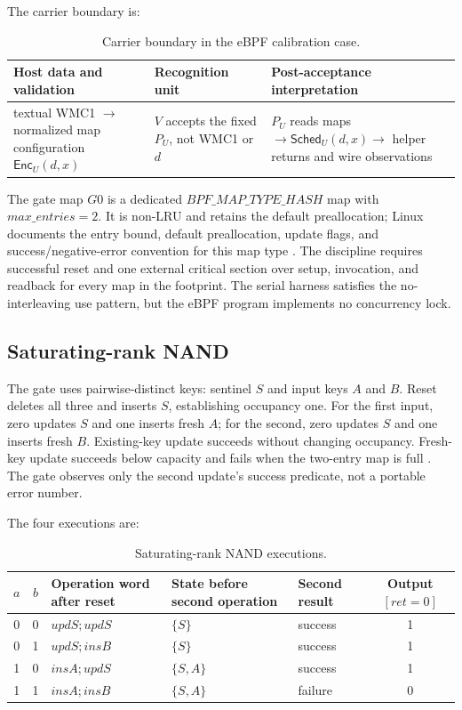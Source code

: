 \documentclass[conference]{IEEEtran}
\begin{document}
The carrier boundary is:

\begin{table}[t]
\caption{Carrier boundary in the eBPF calibration case.}
\label{tab:carrier-boundary}
\centering
\begin{tabularx}{\textwidth}{@{}Y Y Y@{}}
\toprule
Host data and validation & Recognition unit & Post-acceptance interpretation \\
\midrule
textual WMC1 $\rightarrow$ normalized map configuration $\mathsf{Enc}_U(d,x)$ & $V$ accepts the fixed $P_U$, not WMC1 or $d$ & $P_U$ reads maps $\rightarrow\mathsf{Sched}_U(d,x)\rightarrow$ helper returns and wire observations \\
\bottomrule
\end{tabularx}
\end{table}

The gate map $G0$ is a dedicated $\mathit{BPF\_MAP\_TYPE\_HASH}$ map with $\mathit{max\_entries}=2$. It is non-LRU and retains the default preallocation; Linux documents the entry bound, default preallocation, update flags, and success/negative-error convention for this map type \cite{ref8}. The discipline requires successful reset and one external critical section over setup, invocation, and readback for every map in the footprint. The serial harness satisfies the no-interleaving use pattern, but the eBPF program implements no concurrency lock.

\subsection{Saturating-rank NAND}

The gate uses pairwise-distinct keys: sentinel $S$ and input keys $A$ and $B$. Reset deletes all three and inserts $S$, establishing occupancy one. For the first input, zero updates $S$ and one inserts fresh $A$; for the second, zero updates $S$ and one inserts fresh $B$. Existing-key update succeeds without changing occupancy. Fresh-key update succeeds below capacity and fails when the two-entry map is full \cite{ref8}. The gate observes only the second update's success predicate, not a portable error number.

The four executions are:

\begin{table}[t]
\caption{Saturating-rank NAND executions.}
\label{tab:nand}
\centering
\scriptsize
\begin{tabular}{@{}ccp{}p{}p{}c@{}}
\toprule
$a$ & $b$ & Operation word after reset & State before second operation & Second result & Output $[\mathit{ret}=0]$ \\
\midrule
0 & 0 & $\mathit{updS};\mathit{updS}$ & $\{S\}$ & success & 1 \\
0 & 1 & $\mathit{updS};\mathit{insB}$ & $\{S\}$ & success & 1 \\
1 & 0 & $\mathit{insA};\mathit{updS}$ & $\{S,A\}$ & success & 1 \\
1 & 1 & $\mathit{insA};\mathit{insB}$ & $\{S,A\}$ & failure & 0 \\
\bottomrule
\end{tabular}
\end{table}
\end{document}
